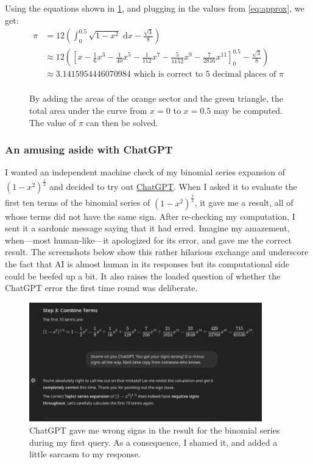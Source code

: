 \documentclass[
  a4paper,
]{article}
\begin{document}
Using the equations shown in \cref{fig:sixty-degrees}, and plugging in
the values from \cref{eq:approx}, we get: \[
\begin{aligned}
\pi &= 12\left(\int_{0}^{0.5}\sqrt{1 - x^2}\; \mathrm{d}x - \frac{\sqrt{3}}{8} \right)\\
&\approx 12 \left(\left[x - \frac{1}{6}x^3 - \frac{1}{40}x^5 - \frac{1}{112}x^7 - \frac{5}{1152}x^9 - \frac{7}{2816}x^{11} \right]_{0}^{0.5} - \frac{\sqrt{3}}{8}\right)\\
&\approx 3.1415954446070984 \text{ which is correct to 5 decimal places of }\pi\\
\end{aligned}
\]

\begin{figure}
\centering

\caption{By adding the areas of the orange sector and the green
triangle, the total area under the curve from \(x = 0\) to \(x = 0.5\)
may be computed. The value of \(\pi\) can then be
solved.}\label{fig:sixty-degrees}
\end{figure}

\subsubsection{An amusing aside with
ChatGPT}\label{an-amusing-aside-with-chatgpt}

I wanted an independent machine check of my binomial series expansion of
\((1 -x^2)^{\frac{1}{2}}\) and decided to try out
\href{https://chatgpt.com/}{ChatGPT}. When I asked it to evaluate the
first ten terms of the binomial series of \((1-x^2)^{\frac{1}{2}}\), it
gave me a result, all of whose terms did not have the same sign. After
re-checking my computation, I sent it a sardonic message saying that it
had erred. Imagine my amazement, when---most human-like---it apologized
for its error, and gave me the correct result. The screenshots below
show this rather hilarious exchange and underscore the fact that AI is
almost human in its responses but its computational side could be beefed
up a bit. It also raises the loaded question of whether the ChatGPT
error the first time round was deliberate.

\begin{figure}
\centering
\includegraphics[width=0.9\textwidth,height=\textheight]{images/wrong-results.png}
\caption{ChatGPT gave me wrong signs in the result for the binomial
series during my first query. As a consequence, I shamed it, and added a
little sarcasm to my response.}\label{fig:wrong-results}
\end{figure}
\end{document}
